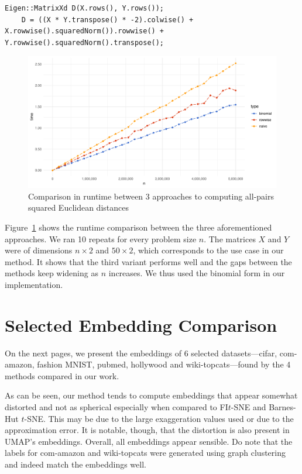 \begin{appendix}
\begin{lstlisting}[breaklines,postbreak=\mbox{\textcolor{red}{$\hookrightarrow$}\space}, basicstyle=\ttfamily,caption={Binomial theorem approach}]
    Eigen::MatrixXd D(X.rows(), Y.rows());
    D = ((X * Y.transpose() * -2).colwise() + X.rowwise().squaredNorm()).rowwise() + Y.rowwise().squaredNorm().transpose();
\end{lstlisting}

\begin{figure}[tbp]
    \centering
    \includegraphics[width=\textwidth]{img/matmult_benchmark}
    \caption{Comparison in runtime between 3 approaches to computing all-pairs squared Euclidean distances}
    \label{fig:matmult}
\end{figure}

Figure~\ref{fig:matmult} shows the runtime comparison between the three aforementioned
approaches. We ran 10 repeats for every problem size $n$. The matrices $X$ and $Y$
were of dimensions $n \times 2$ and $50 \times 2$, which corresponds to the use case
in our method. It shows that the third variant performs well and the gaps between the methods
keep widening as $n$ increases. We thus used the binomial form in our implementation.

\chapter{Selected Embedding Comparison}\label{ap:c}

On the next pages, we present the embeddings of 6 selected datasets---cifar, com-amazon,
fashion MNIST, pubmed, hollywood and wiki-topcats---found by the 4 methods compared in
our work.

As can be seen, our method tends to compute embeddings that appear somewhat distorted
and not as spherical especially when compared to FI$t$-SNE and Barnes-Hut $t$-SNE.
This may be due to the large exaggeration values used or due to the approximation error.
It is notable, though, that the distortion is also present in UMAP's embeddings. Overall,
all embeddings appear sensible. Do note that the labels for com-amazon and wiki-topcats
were generated using graph clustering and indeed match the embeddings well.


\end{appendix}
